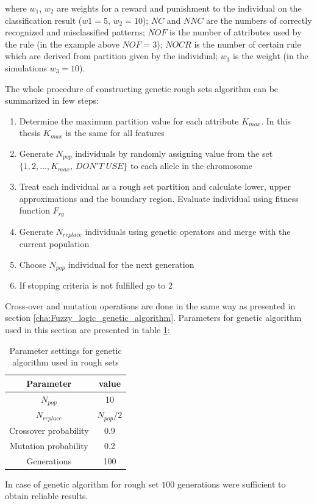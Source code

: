 where $w_1$, $w_2$ are weights for a reward and punishment to
the individual on the classification result ($w1=5$, $w_2=10$); $NC$ and $NNC$ are
the numbers of correctly recognized and misclassified patterns; $NOF$ is the number of
attributes used by the rule (in the example above $NOF=3$);
$NOCR$ is the number of certain rule which are derived from
partition given by the individual; $w_3$ is the weight (in the simulations
$w_3=10$).


The whole procedure of constructing genetic rough sets algorithm can be summarized in few steps:
\begin{enumerate}
    \item Determine the maximum partition value for each attribute $K_{max}$. In
        this thesis $K_{max}$ is the same for all features
    \item Generate $N_{pop}$ individuals by randomly assigning value from the
        set $\{1, 2, \ldots, K_{max}, \, DON'T\; USE\}$ to each allele in the
        chromosome
    \item Treat each individual as a rough set partition and calculate lower,
        upper approximations and the boundary region. Evaluate individual using
        fitness function $F_{rg}$
    \item Generate $N_{replace}$ individuals using genetic operators and merge
        with the current population
    \item Choose $N_{pop}$ individual for the next generation
    \item If stopping criteria is not fulfilled go to $2$
\end{enumerate}
Cross-over and mutation operations are done in the same way as presented in
section \ref{cha:Fuzzy_logic_genetic_algorithm}. Parameters for genetic algorithm 
used in this section are presented in table \ref{tab:rough_genetic_parameters}:
\begin{table}[H]
    \caption{Parameter settings for genetic algorithm used in rough sets}
    \centering
    \begin{tabular}{|c|c|}
        \hline
        Parameter & value \\ \hline \hline
        $N_{pop}$ & 10 \\ \hline
        $N_{replace}$ & $N_{pop}/2$ \\ \hline
        Crossover probability & 0.9 \\ \hline
        Mutation probability & 0.2 \\ \hline
        Generations & 100 \\ \hline
    \end{tabular}
    \label{tab:rough_genetic_parameters}
\end{table}
In case of genetic algorithm for rough set $100$ generations were sufficient to
obtain reliable results.
